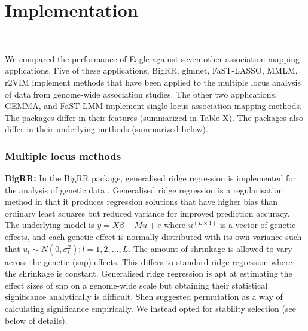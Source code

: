 \documentclass{nature}
\begin{document}
\section{Implementation}


$------$




We compared the performance of Eagle against seven other association mapping applications. 
Five of these applications, BigRR, glmnet, FaST-LASSO, MMLM, r2VIM implement methods that have been applied to the multiple locus analysis of data from genome-wide association studies. 
The other two applications, GEMMA, and FaST-LMM implement single-locus association mapping methods. 
The packages 
differ in their features (summarized in Table X).  The packages also differ in their underlying methods (summarized below). 

\subsubsection{Multiple locus methods}

\textbf{BigRR:}  In the BigRR package,  generalised ridge regression is implemented  for
the analysis of genetic data \cite{shen2013novel}.  Generalised ridge regression 
 is a regularisation method in that it produces regression solutions 
that have higher bias than ordinary least squares but reduced variance for improved prediction accuracy. The underlying 
model is  $y = X \beta + M u + e$ where $u^{(L \times 1)}$ is a vector of genetic effects, and each genetic 
effect is normally distributed with its own variance such that $u_l \sim N(0, \sigma^2_l); l=1,2, \ldots, L$.  The 
amount of shrinkage is allowed to vary across the genetic (snp) effects. This differs to 
standard ridge regression where the shrinkage is constant. 
Generalised ridge regression is apt at estimating the effect sizes of snp on a genome-wide scale but  obtaining their 
statistical significance analytically is difficult. Shen \cite{shen2013novel} suggested permutation as a way of calculating significance 
empirically. We instead opted for stability selection (see below of details). 
\end{document}
